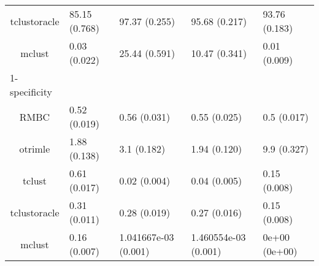 \begin{longtable}{cllll}
tclustoracle & 85.15 (0.768) & 97.37 (0.255) & 95.68 (0.217) & 93.76 (0.183) \\ 
mclust & 0.03 (0.022) & 25.44 (0.591) & 10.47 (0.341) & 0.01 (0.009) \\ 
\midrule
\multicolumn{1}{l}{1-specificity} \\ 
\midrule
RMBC & 0.52 (0.019) & 0.56 (0.031) & 0.55 (0.025) & 0.5 (0.017) \\ 
otrimle & 1.88 (0.138) & 3.1 (0.182) & 1.94 (0.120) & 9.9 (0.327) \\ 
tclust & 0.61 (0.017) & 0.02 (0.004) & 0.04 (0.005) & 0.15 (0.008) \\ 
tclustoracle & 0.31 (0.011) & 0.28 (0.019) & 0.27 (0.016) & 0.15 (0.008) \\ 
mclust & 0.16 (0.007) & 1.041667e-03 (0.001) & 1.460554e-03 (0.001) & 0e+00 (0e+00) \\ 
\bottomrule
\end{longtable}


